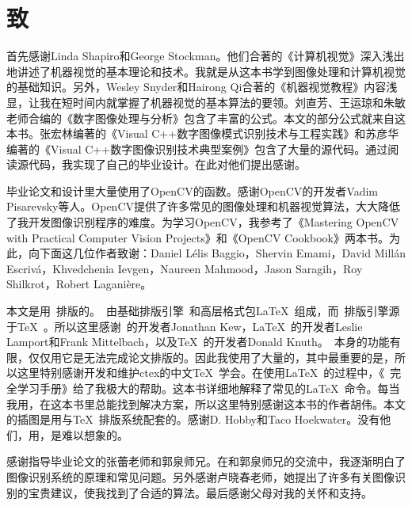
\chapter*{致}

首先感谢Linda Shapiro和George Stockman。他们合著的《计算机视觉》深入浅出地讲述了机器视觉的基本理论和技术。我就是从这本书学到图像处理和计算机视觉的基础知识。另外，Wesley Snyder和Hairong Qi合著的《机器视觉教程》内容浅显，让我在短时间内就掌握了机器视觉的基本算法的要领。刘直芳、王运琼和朱敏老师合编的《数字图像处理与分析》包含了丰富的公式。本文的部分公式就来自这本书。张宏林编著的《Visual C++数字图像模式识别技术与工程实践》和苏彦华编著的《Visual C++数字图像识别技术典型案例》包含了大量的源代码。通过阅读源代码，我实现了自己的毕业设计。在此对他们提出感谢。

毕业论文和设计里大量使用了OpenCV的函数。感谢OpenCV的开发者Vadim Pisarevsky等人。OpenCV提供了许多常见的图像处理和机器视觉算法，大大降低了我开发图像识别程序的难度。为学习OpenCV，我参考了《Mastering OpenCV with Practical Computer Vision Projects》和《OpenCV Cookbook》两本书。为此，向下面这几位作者致谢：Daniel Lélis Baggio，Shervin Emami，David Millán Escrivá，Khvedchenia Ievgen，Naureen Mahmood，Jason Saragih，Roy Shilkrot，Robert Laganière。

本文是用\XeLaTeX~排版的。\XeLaTeX~由基础排版引擎\XeTeX~和高层格式包\LaTeX~组成，而\XeTeX~排版引擎源于\TeX~。所以这里感谢\XeTeX~的开发者Jonathan Kew，\LaTeX~的开发者Leslie Lamport和Frank Mittelbach，以及\TeX~的开发者Donald Knuth。\XeLaTeX~本身的功能有限，仅仅用它是无法完成论文排版的。因此我使用了大量的，其中最重要的是，所以这里特别感谢开发和维护ctex的中文\TeX~学会。在使用\LaTeX~的过程中，《\LaTeXe~完全学习手册》给了我极大的帮助。这本书详细地解释了常见的\LaTeX~命令。每当我用，在这本书里总能找到解决方案，所以这里特别感谢这本书的作者胡伟。本文的插图是用与\TeX~排版系统配套的。感谢 D. Hobby和Taco Hoekwater。没有他们，用，是难以想象的。

感谢指导毕业论文的张蕾老师和郭泉师兄。在和郭泉师兄的交流中，我逐渐明白了图像识别系统的原理和常见问题。另外感谢卢晓春老师，她提出了许多有关图像识别的宝贵建议，使我找到了合适的算法。最后感谢父母对我的关怀和支持。
